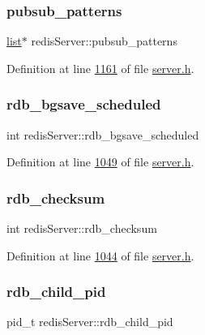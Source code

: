 \subsubsection{\texorpdfstring{pubsub\+\_\+patterns}{pubsub\_patterns}}
{\footnotesize\ttfamily \hyperlink{structlist}{list}$\ast$ redis\+Server\+::pubsub\+\_\+patterns}



Definition at line \hyperlink{server_8h_source_l01161}{1161} of file \hyperlink{server_8h_source}{server.\+h}.

\mbox{\label{structredisServer_a2ed01331c297857b0af9754c62fad8d7}} 
\subsubsection{\texorpdfstring{rdb\+\_\+bgsave\+\_\+scheduled}{rdb\_bgsave\_scheduled}}
{\footnotesize\ttfamily int redis\+Server\+::rdb\+\_\+bgsave\+\_\+scheduled}



Definition at line \hyperlink{server_8h_source_l01049}{1049} of file \hyperlink{server_8h_source}{server.\+h}.

\mbox{\label{structredisServer_a328563769cf9a22e95e893a2f17ed0c5}} 
\subsubsection{\texorpdfstring{rdb\+\_\+checksum}{rdb\_checksum}}
{\footnotesize\ttfamily int redis\+Server\+::rdb\+\_\+checksum}



Definition at line \hyperlink{server_8h_source_l01044}{1044} of file \hyperlink{server_8h_source}{server.\+h}.

\mbox{\label{structredisServer_a4a9281f796dc4d2f4fc312ee6020a9b2}} 
\subsubsection{\texorpdfstring{rdb\+\_\+child\+\_\+pid}{rdb\_child\_pid}}
{\footnotesize\ttfamily pid\+\_\+t redis\+Server\+::rdb\+\_\+child\+\_\+pid}



